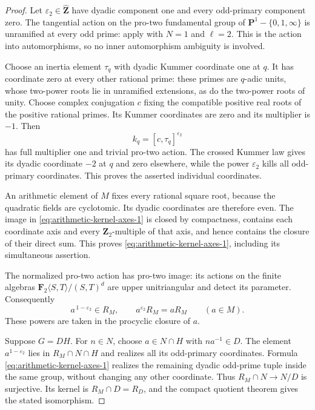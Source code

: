 \begin{proof}
Let \(\varepsilon_2\in\widehat{\mathbf Z}\) have dyadic component
one and every odd-primary component zero.
The tangential action on the pro-two fundamental group of
\(\mathbf P^1-\{0,1,\infty\}\) is unramified at every odd prime:
apply \cite[\S8.5, p.~151]{HainMatsumoto2003} with \(N=1\) and
\(\ell=2\). This is the action into automorphisms, so no inner
automorphism ambiguity is involved.

Choose an inertia element \(\tau_q\) with dyadic Kummer coordinate
one at \(q\). It has coordinate zero at every other rational
prime: these primes are \(q\)-adic units, whose two-power roots
lie in unramified extensions, as do the two-power roots of unity.
Choose complex conjugation \(c\) fixing the compatible positive
real roots of the positive rational primes. Its Kummer coordinates
are zero and its multiplier is \(-1\). Then
\[
 k_q=[c,\tau_q]^{\varepsilon_2}
\]
has full multiplier one and trivial pro-two action.
The crossed Kummer law gives its dyadic coordinate \(-2\) at \(q\)
and zero elsewhere, while the power \(\varepsilon_2\) kills all
odd-primary coordinates. This proves the asserted individual
coordinates.

An arithmetic element of \(M\) fixes every rational square root,
because the quadratic fields are cyclotomic. Its dyadic coordinates
are therefore even. The image in \eqref{eq:arithmetic-kernel-axes-1} is closed by compactness,
contains each coordinate axis and every \(\mathbf Z_2\)-multiple
of that axis, and hence contains the closure of their direct sum.
This proves \eqref{eq:arithmetic-kernel-axes-1}, including its simultaneous assertion.

The normalized pro-two action has pro-two image: its actions on
the finite algebras
\(\mathbf F_2\langle S,T\rangle/(S,T)^d\) are upper unitriangular
and detect its parameter. Consequently
\begin{equation}
 a^{\,1-\varepsilon_2}\in R_M,\qquad
 a^{\varepsilon_2}R_M=aR_M\qquad(a\in M).                \label{eq:arithmetic-kernel-axes-2}
\end{equation}
These powers are taken in the procyclic closure of \(a\).

Suppose \(G=DH\). For \(n\in N\), choose \(a\in N\cap H\)
with \(na^{-1}\in D\). The element \(a^{1-\varepsilon_2}\)
lies in \(R_M\cap N\cap H\) and realizes all its odd-primary
coordinates. Formula \eqref{eq:arithmetic-kernel-axes-1} realizes the remaining dyadic
odd-prime tuple inside the same group, without changing any
other coordinate. Thus \(R_M\cap N\to N/D\) is surjective.
Its kernel is \(R_M\cap D=R_D\), and the compact quotient theorem
gives the stated isomorphism.


\end{proof}
